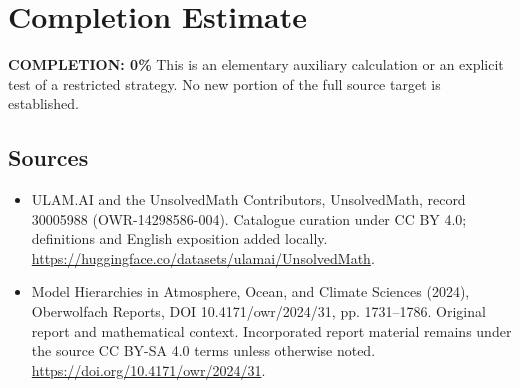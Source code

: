 \documentclass[11pt]{article}
\begin{document}
\section{Completion Estimate}
\noindent\textbf{COMPLETION: 0\%}
This is an elementary auxiliary calculation or an explicit test of a restricted strategy. No new portion of the full source target is established.

\subsection{Sources}
\begin{itemize}
\item[\hypertarget{source:30005988:1}{S1}] ULAM.AI and the UnsolvedMath Contributors, UnsolvedMath, record 30005988 (OWR-14298586-004). Catalogue curation under CC BY 4.0; definitions and English exposition added locally.
\url{https://huggingface.co/datasets/ulamai/UnsolvedMath}.
\item[\hypertarget{source:30005988:2}{S2}] Model Hierarchies in Atmosphere, Ocean, and Climate Sciences (2024), Oberwolfach Reports, DOI 10.4171/owr/2024/31, pp. 1731--1786. Original report and mathematical context. Incorporated report material remains under the source CC BY-SA 4.0 terms unless otherwise noted.
\url{https://doi.org/10.4171/owr/2024/31}.
\end{itemize}
\label{end:30005988}
\end{document}
